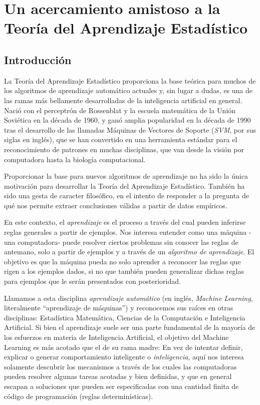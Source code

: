 \documentclass{report}
\begin{document}
\chapter{Un acercamiento amistoso a la Teoría del Aprendizaje Estadístico}
\section{Introducción}
La Teoría del Aprendizaje Estadístico proporciona la base teórica para muchos de los algoritmos de aprendizaje automático actuales y,
sin lugar a dudas, es una de las ramas más bellamente desarrolladas de la inteligencia artificial en general. Nació con el perceptrón de Rossenblat
y la escuela matemática de la Unión Soviética en la década de 1960, y ganó amplia popularidad en la década de 1990 tras el desarrollo de las llamadas 
Máquinas de Vectores de Soporte (\textit{SVM}, por sus siglas en inglés), que se han convertido en una herramienta estándar para el reconocimiento de 
patrones en muchas disciplinas, que van desde la visión por computadora hasta la biología computacional.\newline

Proporcionar la base para nuevos algoritmos de aprendizaje no ha sido la única motivación para desarrollar la Teoría del Aprendizaje 
Estadístico. También ha sido una gesta de caracter filosófico, en el intento de responder a la pregunta de qué nos permite extraer conclusiones válidas 
a partir de datos empíricos.  \newline


En este contexto, el \textit{aprendizaje} es el proceso a través del cual pueden inferirse reglas generales a partir de ejemplos. Nos interesa 
entender como una máquina -una computadora- puede resolver ciertos problemas sin conocer las reglas de antemano, solo a partir de ejemplos y a través
de un \textit{algoritmo de aprendizaje}. El objetivo es que la máquina pueda no solo aprender a reconocer las reglas que rigen a los ejemplos dados,
si no que también pueden generalizar dichas reglas para ejemplos que le serán presentados con posterioridad.\newline

Llamamos a esta disciplina \textit{aprendizaje automático} (en inglés, \textit{Machine Learning}, literalmente ``aprendizaje de máquinas'') y reconocemos
sus raíces en otras disciplinas: Estadística Matemática, Ciencias de la Computación e Inteligencia Artificial. Si bien el aprendizaje suele ser una
parte fundamental de la mayoría de los esfuerzos en materia de Inteligencia Artificial, el objetivo del Machine Learning es más acotado que el de su 
rama madre: En vez de intentar definir, explicar o generar comportamiento inteligente o \textit{inteligencia}, aquí nos interesa solamente descubrir los mecanismos
a través de los cuales las computadoras pueden resolver algunas tareas acotadas y bien definidas, y que en general escapan a soluciones que pueden
ser especificadas con una cantidad finita de código de programación (reglas determinísticas).\newline
\end{document}
